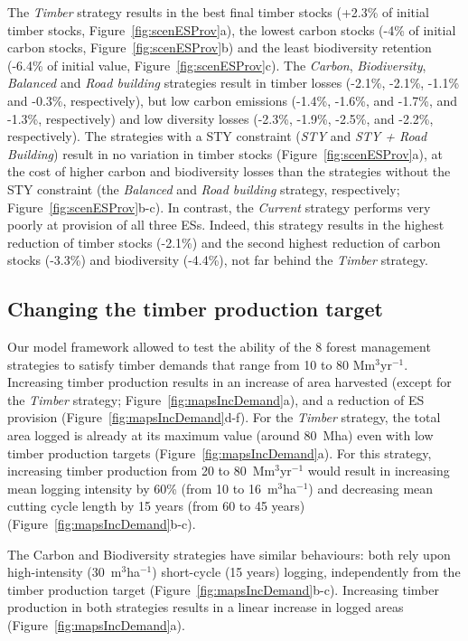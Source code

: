 \documentclass{article}
\begin{document}
The \textit{Timber} strategy results in the best final timber stocks (+2.3\% of initial timber stocks, Figure~\ref{fig:scenESProv}a), the lowest carbon stocks (-4\% of initial carbon stocks, Figure~\ref{fig:scenESProv}b) and the least biodiversity retention (-6.4\% of initial value, Figure~\ref{fig:scenESProv}c). The \textit{Carbon}, \textit{Biodiversity}, \textit{Balanced} and \textit{Road building} strategies result in timber losses (-2.1\%, -2.1\%, -1.1\% and -0.3\%, respectively), but low carbon emissions (-1.4\%, -1.6\%, and -1.7\%, and -1.3\%, respectively) and low diversity losses (-2.3\%, -1.9\%, -2.5\%, and -2.2\%, respectively). The strategies with a STY constraint (\textit{STY} and \textit{STY + Road Building}) result in no variation in timber stocks (Figure~\ref{fig:scenESProv}a), at the cost of higher carbon and biodiversity losses than the strategies without the STY constraint (the \textit{Balanced} and \textit{Road building} strategy, respectively; Figure~\ref{fig:scenESProv}b-c). In contrast, the \textit{Current} strategy performs very poorly at provision of all three ESs. Indeed, this strategy results in the highest reduction of timber stocks (-2.1\%) and the second highest reduction of carbon stocks (-3.3\%) and biodiversity (-4.4\%), not far behind the \textit{Timber} strategy. 

\subsection{Changing the timber production target}

Our model framework allowed to test the ability of the 8 forest management strategies to satisfy timber demands that range from 10 to 80 Mm$^3$yr$^{-1}$. Increasing timber production results in an increase of area harvested (except for the \textit{Timber} strategy; Figure~\ref{fig:mapsIncDemand}a), and a reduction of ES provision (Figure~\ref{fig:mapsIncDemand}d-f). For the \textit{Timber} strategy, the total area logged is already at its maximum value (around 80~Mha) even with low timber production targets (Figure~\ref{fig:mapsIncDemand}a). For this strategy, increasing timber production from 20 to 80~Mm$^3$yr$^{-1}$ would result in increasing mean logging intensity by 60\% (from 10 to 16~m$^3$ha$^{-1}$) and decreasing mean cutting cycle length by 15 years (from 60 to 45 years) (Figure~\ref{fig:mapsIncDemand}b-c).

The Carbon and Biodiversity strategies have similar behaviours: both rely upon high-intensity (30~m$^3$ha$^{-1}$) short-cycle (15 years) logging, independently from the timber production target (Figure~\ref{fig:mapsIncDemand}b-c). Increasing timber production in both strategies results in a linear increase in logged areas (Figure~\ref{fig:mapsIncDemand}a).
\end{document}
